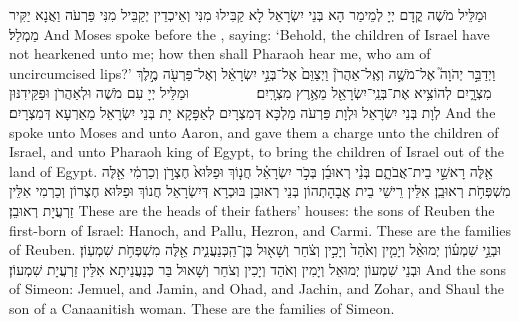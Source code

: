 {וּמַלֵּיל מֹשֶׁה קֳדָם יְיָ לְמֵימַר הָא בְּנֵי יִשְׂרָאֵל לָא קַבִּילוּ מִנִּי וְאֵיכְדֵין יְקַבֵּיל מִנִּי פַּרְעֹה וַאֲנָא יַקִּיר מַמְלַל׃}
{And Moses spoke before the \lord, saying: ‘Behold, the children of Israel have not hearkened unto me; how then shall Pharaoh hear me, who am of uncircumcised lips?’}{}
{וַיְדַבֵּ֣ר יְהֹוָה֮ אֶל־מֹשֶׁ֣ה וְאֶֽל־אַהֲרֹן֒ וַיְצַוֵּם֙ אֶל־בְּנֵ֣י יִשְׂרָאֵ֔ל וְאֶל־פַּרְעֹ֖ה מֶ֣לֶךְ מִצְרָ֑יִם לְהוֹצִ֥יא אֶת־בְּנֵֽי־יִשְׂרָאֵ֖ל מֵאֶ֥רֶץ מִצְרָֽיִם׃ \setuma         
}
{וּמַלֵּיל יְיָ עִם מֹשֶׁה וּלְאַהֲרֹן וּפַקֵּידִנּוּן לְוָת בְּנֵי יִשְׂרָאֵל וּלְוָת פַּרְעֹה מַלְכָּא דְּמִצְרָיִם לְאַפָּקָא יָת בְּנֵי יִשְׂרָאֵל מֵאַרְעָא דְּמִצְרָיִם׃}
{And the \lord\space spoke unto Moses and unto Aaron, and gave them a charge unto the children of Israel, and unto Pharaoh king of Egypt, to bring the children of Israel out of the land of Egypt.}{}
{אֵ֖לֶּה רָאשֵׁ֣י בֵית־אֲבֹתָ֑ם בְּנֵ֨י רְאוּבֵ֜ן בְּכֹ֣ר יִשְׂרָאֵ֗ל חֲנ֤וֹךְ וּפַלּוּא֙ חֶצְרֹ֣ן וְכַרְמִ֔י אֵ֖לֶּה מִשְׁפְּחֹ֥ת רְאוּבֵֽן׃
}
{אִלֵּין רֵישֵׁי בֵית אֲבָהָתְהוֹן בְּנֵי רְאוּבֵן בּוּכְרָא דְּיִשְׂרָאֵל חֲנוֹךְ וּפַלּוּא חֶצְרוֹן וְכַרְמִי אִלֵּין זַרְעֲיָת רְאוּבֵן׃}
{These are the heads of their fathers’ houses: the sons of Reuben the first-born of Israel: Hanoch, and Pallu, Hezron, and Carmi. These are the families of Reuben.}{}
{וּבְנֵ֣י שִׁמְע֗וֹן יְמוּאֵ֨ל וְיָמִ֤ין וְאֹ֙הַד֙ וְיָכִ֣ין וְצֹ֔חַר וְשָׁא֖וּל בֶּן־הַֽכְּנַעֲנִ֑ית אֵ֖לֶּה מִשְׁפְּחֹ֥ת שִׁמְעֽוֹן׃}
{וּבְנֵי שִׁמְעוֹן יְמוּאֵל וְיָמִין וְאֹהַד וְיָכִין וְצֹחַר וְשָׁאוּל בַּר כְּנַעֲנֵיתָא אִלֵּין זַרְעֲיָת שִׁמְעוֹן׃}
{And the sons of Simeon: Jemuel, and Jamin, and Ohad, and Jachin, and Zohar, and Shaul the son of a Canaanitish woman. These are the families of Simeon.}{}
